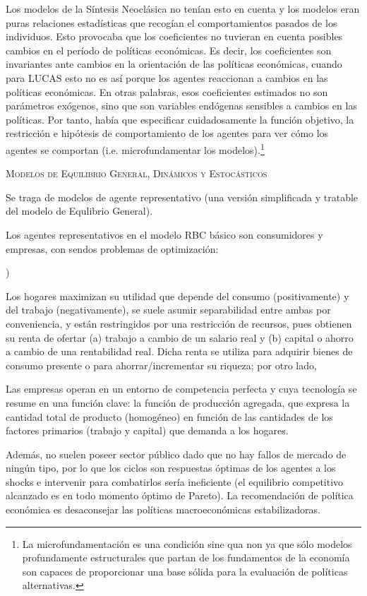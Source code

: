 \documentclass[10pt,a4paper]{article}
\newcounter{alphaitem}
\newenvironment{la}
      {\begin{list}{\alph{alphaitem})}{%
          \usecounter{alphaitem}%
          \setlength{\leftmargin}{1cm}%
          \setlength{\parskip}{3pt}%
          \setlength{\itemsep}{0pt}%
          \setlength{\parsep}{0pt}%
      }}
      {\end{list}}
\begin{document}
Los modelos de la Síntesis Neoclásica no tenían esto en cuenta y los modelos eran puras relaciones estadísticas que recogían el comportamientos pasados de los individuos. Esto provocaba que los coeficientes no tuvieran en cuenta posibles cambios en el período de políticas económicas. Es decir, los coeficientes son invariantes ante cambios en la orientación de las políticas económicas, cuando para LUCAS esto no es así porque los agentes reaccionan a cambios en las políticas económicas. En otras palabras, esos coeficientes estimados no son parámetros exógenos, sino que son variables endógenas sensibles a cambios en las políticas. Por tanto, había que especificar cuidadosamente la función objetivo, la restricción e hipótesis de comportamiento de los agentes para ver cómo los agentes se comportan (i.e. microfundamentar los modelos).\footnote{%
    La microfundamentación es una condición sine qua non ya que sólo modelos profundamente estructurales que partan de los fundamentos de la economía son capaces de proporcionar una base sólida para la evaluación de políticas alternativas.
}

\textsc{Modelos de Equilibrio General, Dinámicos y Estocásticos}

Se traga de modelos de agente representativo (una versión simplificada y tratable del modelo de Equlibrio General). 

Los agentes representativos en el modelo RBC básico son consumidores y empresas, con sendos problemas de optimización:
\begin{la}
  \item Los hogares maximizan su utilidad que depende del consumo (positivamente) y del trabajo (negativamente), se suele asumir separabilidad entre ambas por conveniencia, y están restringidos por una restricción de recursos, pues obtienen su renta de ofertar (a) trabajo a cambio de un salario real y (b) capital o ahorro a cambio de una rentabilidad real. Dicha renta se utiliza para adquirir bienes de consumo presente o para ahorrar/incrementar su riqueza; por otro lado,
  \item Las empresas operan en un entorno de competencia perfecta y cuya tecnología se resume en una función clave: la función de producción agregada, que expresa la cantidad total de producto (homogéneo) en función de las cantidades de los factores primarios (trabajo y capital) que demanda a los hogares.
\end{la}

Además, no suelen poseer sector público dado que no hay fallos de mercado de ningún tipo, por lo que los ciclos son respuestas óptimas de los agentes a los shocks e intervenir para combatirlos sería ineficiente (el equilibrio competitivo alcanzado es en todo momento óptimo de Pareto). La recomendación de política económica es desaconsejar las políticas macroeconómicas estabilizadoras.
\end{document}
